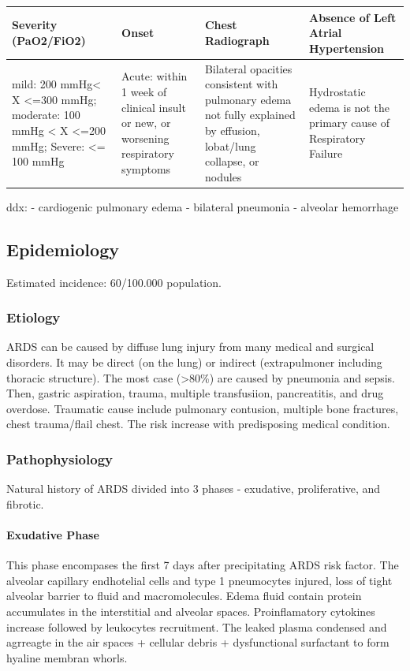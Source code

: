 \documentclass[
  letterpaper,
  DIV=11,
  numbers=noendperiod]{scrreprt}
\let\oldparagraph\paragraph
\renewcommand{\paragraph}[1]{\oldparagraph{#1}\mbox{}}
\begin{document}
\begin{longtable*}{llll}
\toprule
Severity (PaO2/FiO2) & Onset & Chest Radiograph & Absence of Left Atrial Hypertension \\ 
\midrule\addlinespace[2.5pt]
mild: 200 mmHg< X  <=300 mmHg; moderate: 100 mmHg < X <=200 mmHg; Severe: <= 100 mmHg & Acute: within 1 week of clinical insult or new, or worsening respiratory symptoms & Bilateral opacities consistent with pulmonary edema not fully explained by effusion, lobat/lung collapse, or nodules & Hydrostatic edema is not the primary cause of Respiratory Failure \\ 
\bottomrule
\end{longtable*}

ddx: - cardiogenic pulmonary edema - bilateral pneumonia - alveolar
hemorrhage

\subsection{Epidemiology}\label{epidemiology}

Estimated incidence: 60/100.000 population.

\subsubsection{Etiology}\label{etiology}

ARDS can be caused by diffuse lung injury from many medical and surgical
disorders. It may be direct (on the lung) or indirect (extrapulmoner
including thoracic structure). The most case (\textgreater80\%) are
caused by pneumonia and sepsis. Then, gastric aspiration, trauma,
multiple transfusiion, pancreatitis, and drug overdose. Traumatic cause
include pulmonary contusion, multiple bone fractures, chest trauma/flail
chest. The risk increase with predisposing medical condition.

\subsubsection{Pathophysiology}\label{pathophysiology}

Natural history of ARDS divided into 3 phases - exudative,
proliferative, and fibrotic.

\paragraph{Exudative Phase}\label{exudative-phase}

This phase encompases the first 7 days after precipitating ARDS risk
factor. The alveolar capillary endhotelial cells and type 1 pneumocytes
injured, loss of tight alveolar barrier to fluid and macromolecules.
Edema fluid contain protein accumulates in the interstitial and alveolar
spaces. Proinflamatory cytokines increase followed by leukocytes
recruitment. The leaked plasma condensed and agrreagte in the air spaces
+ cellular debris + dysfunctional surfactant to form hyaline membran
whorls.
\end{document}
